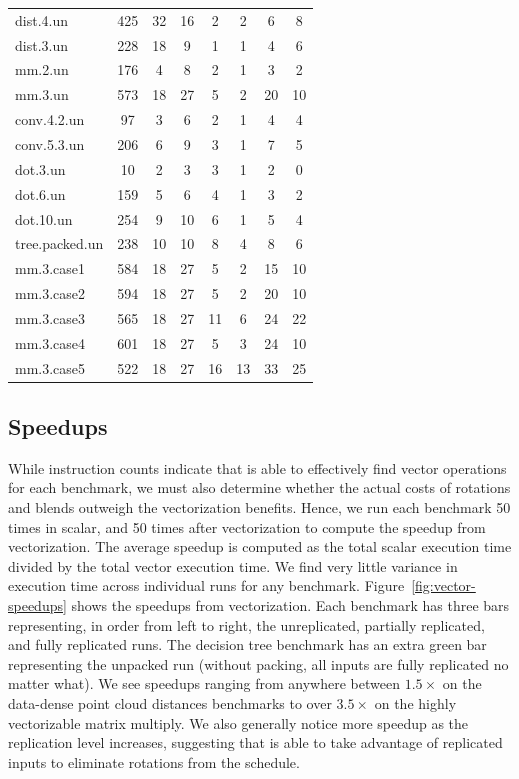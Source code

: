 \begin{table}
\begin{tabular}{lccccccc}
    dist.4.un & 425 & 32 & 16 & 2 & 2 & 6 & 8\\
    dist.3.un & 228 & 18 & 9 & 1 & 1 & 4 & 6\\
    mm.2.un & 176 & 4 & 8 & 2 & 1 & 3 & 2\\
    mm.3.un & 573 & 18 & 27 & 5 & 2 & 20 & 10\\
    conv.4.2.un & 97 & 3 & 6 & 2 & 1 & 4 & 4\\
    conv.5.3.un & 206 & 6 & 9 & 3 & 1 & 7 & 5\\
    dot.3.un & 10 & 2 & 3 & 3 & 1 & 2 & 0\\
    dot.6.un & 159 & 5 & 6 & 4 & 1 & 3 & 2\\
    dot.10.un & 254 & 9 & 10 & 6 & 1 & 5 & 4\\
    tree.packed.un & 238 & 10 & 10 & 8 & 4 & 8 & 6\\
    mm.3.case1 & 584 & 18 & 27 & 5 & 2 & 15 & 10\\
    mm.3.case2 & 594 & 18 & 27 & 5 & 2 & 20 & 10\\
    mm.3.case3 & 565 & 18 & 27 & 11 & 6 & 24 & 22\\
    mm.3.case4 & 601 & 18 & 27 & 5 & 3 & 24 & 10\\
    mm.3.case5 & 522 & 18 & 27 & 16 & 13 & 33 & 25\\\bottomrule
    \end{tabular}
\end{table}

\subsection{Speedups}\label{sec:speedups}
While instruction counts indicate that \system is able to effectively find vector operations for each benchmark, we must also determine whether the actual costs of rotations and blends outweigh the vectorization benefits. Hence, we run each benchmark 50 times in scalar, and 50 times after vectorization to compute the speedup from vectorization.
The average speedup is computed as the total scalar execution time divided by the total vector execution time.
We find very little variance in execution time across individual runs for any benchmark.
Figure~\ref{fig:vector-speedups} shows the speedups from vectorization. Each benchmark has three bars representing, in order from left to right, the unreplicated, partially replicated, and fully replicated runs. 
The decision tree benchmark has an extra green bar representing the unpacked run (without packing, all inputs are fully replicated no matter what).
We see speedups ranging from anywhere between $1.5\times$ on the data-dense point cloud distances benchmarks to over $3.5\times$ on the highly vectorizable matrix multiply.
We also generally notice more speedup as the replication level increases, suggesting that \system is able to take advantage of replicated inputs to eliminate rotations from the schedule.

